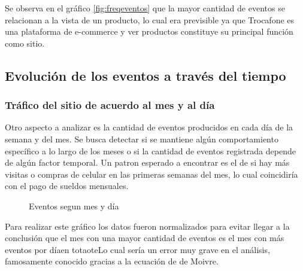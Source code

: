 \documentclass[a4paper]{article}
\begin{document}
Se observa en el gráfico \ref{fig:freqeventos} que la mayor cantidad de eventos se relacionan a la vista de un producto, lo cual era previsible ya que Trocafone es una plataforma de e-commerce y ver productos constituye su principal función como sitio.

\subsection{Evolución de los eventos a través del tiempo}

\subsubsection{Tráfico del sitio de acuerdo al mes y al día}

Otro aspecto a analizar es la cantidad de eventos producidos en cada día de la semana y del mes. Se busca detectar si se mantiene algún comportamiento específico a lo largo de los meses o si la cantidad de eventos registrada depende de algún factor temporal. Un patron esperado a encontrar es el de si hay más visitas o compras de celular en las primeras semanas del mes, lo cual coincidiría con el pago de sueldos mensuales.

\begin{figure}[h!]
	\caption{Eventos segun mes y día}
	\label{fig:mesdiasnormalizado}
\end{figure}

Para realizar este gráfico los datos fueron normalizados para evitar llegar a la conclusión que el mes con una mayor cantidad de eventos es el mes con más eventos por díaen totaote{Lo cual sería un error muy grave en el análisis, famosamente conocido gracias a la ecuación de de Moivre}. 
\end{document}
